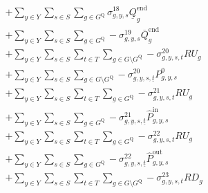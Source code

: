 \documentclass{article}
\newcommand{\sGenerators}{G}
\newcommand{\sStorage}{G^{\mathrm{Q}}}
\newcommand{\sStorageCandidate}{G^{\mathrm{C,Q}}}
\newcommand{\sYears}{Y}
\newcommand{\sScenarios}{S}
\newcommand{\sIntervals}{T}
\newcommand{\sZones}{Z}
\newcommand{\iGenerator}{g}
\newcommand{\iYear}{y}
\newcommand{\iScenario}{s}
\newcommand{\iInterval}{t}
\newcommand{\iIntervalStart}{\underline{\iInterval}}
\newcommand{\iZone}{z}
\newcommand{\cRampRateUp}[1][\iGenerator]{RU_{#1}}
\newcommand{\cRampRateDown}[1][\iGenerator]{RD_{#1}}
\newcommand{\cStorageUnitEnergyIntervalEndMax}[1][\iGenerator]{\overline{Q}^{\mathrm{end}}_{#1}}
\newcommand{\cStorageUnitEnergyIntervalEndMin}[1][\iGenerator]{\underline{Q}^{\mathrm{end}}_{#1}}
\newcommand{\cPowerInitial}[1][\iGenerator,\iYear,\iScenario]{P_{#1}^{0}}
\newcommand{\cPowerOutInitial}[1][\iGenerator,\iYear,\iScenario]{\hat{P}_{#1}^{\mathrm{out}}}
\newcommand{\cPowerInInitial}[1][\iGenerator,\iYear,\iScenario]{\hat{P}_{#1}^{\mathrm{in}}}
\newcommand{\vStorageUnitEnergy}[1][\iGenerator,\iYear,\iScenario,\iInterval]{q_{#1}}
\newcommand{\vLostLoadPower}[1][\iZone,\iYear,\iScenario,\iInterval]{p^{\mathrm{V}}_{#1}}
\newcommand{\vInstalledCapacityTotal}[1][\iGenerator,\iYear]{a_{#1}}
\newcommand{\dMaxStorageEnergyCandidate}[1][\iGenerator,\iYear,\iScenario,\iInterval]{\sigma_{#1}^{17}}
\newcommand{\dMinStorageEnergyIntervalEnd}[1][\iGenerator,\iYear,\iScenario]{\sigma_{#1}^{18}}
\newcommand{\dMaxStorageEnergyIntervalEnd}[1][\iGenerator,\iYear,\iScenario]{\sigma_{#1}^{19}}
\newcommand{\dRampRateUp}[1][\iGenerator,\iYear,\iScenario,\iInterval]{\sigma_{#1}^{20}}
\newcommand{\dRampRateUpStorageCharging}[1][\iGenerator,\iYear,\iScenario,\iInterval]{\sigma_{#1}^{21}}
\newcommand{\dRampRateUpStorageDischarging}[1][\iGenerator,\iYear,\iScenario,\iInterval]{\sigma_{#1}^{22}}
\newcommand{\dRampRateDown}[1][\iGenerator,\iYear,\iScenario,\iInterval]{\sigma_{#1}^{23}}
\newcommand{\dNonNegativeLostLoad}[1][\iZone,\iYear,\iScenario,\iInterval]{\sigma_{#1}^{26}}
\begin{document}
\begin{align}
& + \sum\limits_{\iYear \in \sYears}\sum\limits_{\iScenario \in \sScenarios} \sum\limits_{\iGenerator \in \sStorage} \dMinStorageEnergyIntervalEnd \cStorageUnitEnergyIntervalEndMin\\
& + \sum\limits_{\iYear \in \sYears}\sum\limits_{\iScenario \in \sScenarios} \sum\limits_{\iGenerator \in \sStorage} - \dMaxStorageEnergyIntervalEnd \cStorageUnitEnergyIntervalEndMax\\
%
& + \sum\limits_{\iYear \in \sYears}\sum\limits_{\iScenario \in \sScenarios}\sum\limits_{\iInterval \in \sIntervals} \sum\limits_{\iGenerator \in \sGenerators \setminus \sStorage} - \dRampRateUp \cRampRateUp\\
& + \sum\limits_{\iYear \in \sYears}\sum\limits_{\iScenario \in \sScenarios} \sum\limits_{\iGenerator \in \sGenerators \setminus \sStorage} - \dRampRateUp[\iGenerator,\iYear,\iScenario,\iIntervalStart] \cPowerInitial\\
%
& + \sum\limits_{\iYear \in \sYears}\sum\limits_{\iScenario \in \sScenarios}\sum\limits_{\iInterval \in \sIntervals} \sum\limits_{\iGenerator \in \sStorage} - \dRampRateUpStorageCharging \cRampRateUp\\
& + \sum\limits_{\iYear \in \sYears}\sum\limits_{\iScenario \in \sScenarios} \sum\limits_{\iGenerator \in \sStorage} - \dRampRateUpStorageCharging[\iGenerator,\iYear,\iScenario,\iIntervalStart] \cPowerInInitial\\
%
& + \sum\limits_{\iYear \in \sYears}\sum\limits_{\iScenario \in \sScenarios}\sum\limits_{\iInterval \in \sIntervals} \sum\limits_{\iGenerator \in \sStorage} - \dRampRateUpStorageDischarging \cRampRateUp\\
& + \sum\limits_{\iYear \in \sYears}\sum\limits_{\iScenario \in \sScenarios} \sum\limits_{\iGenerator \in \sStorage} - \dRampRateUpStorageDischarging[\iGenerator,\iYear,\iScenario,\iIntervalStart] \cPowerOutInitial\\
& + \sum\limits_{\iYear \in \sYears}\sum\limits_{\iScenario \in \sScenarios}\sum\limits_{\iInterval \in \sIntervals} \sum\limits_{\iGenerator \in \sGenerators \setminus \sStorage} - \dRampRateDown \cRampRateDown\\

\end{align}
\end{document}
